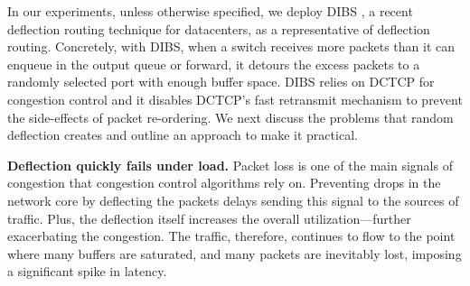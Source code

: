 In our experiments, unless otherwise specified, we deploy DIBS \cite{dibs}, a recent deflection routing technique for datacenters, as a representative of deflection routing. Concretely, with DIBS, when a switch receives more packets than it can enqueue in the output queue or forward, it detours the excess packets to a randomly selected port with enough buffer space. DIBS relies on DCTCP for congestion control and it disables DCTCP's fast retransmit mechanism to prevent the side-effects of packet re-ordering. We next discuss the problems that random deflection creates and outline an approach to make it practical.

\textbf{Deflection quickly fails under load.} 
Packet loss is one of the main signals of congestion that congestion control algorithms rely on. Preventing drops in the network core by deflecting the packets delays sending this signal to the sources of traffic. Plus, the deflection itself increases the overall utilization---further exacerbating the congestion. The traffic, therefore, continues to flow to the point where many buffers are saturated, and many packets are inevitably lost, imposing a significant spike in latency.

